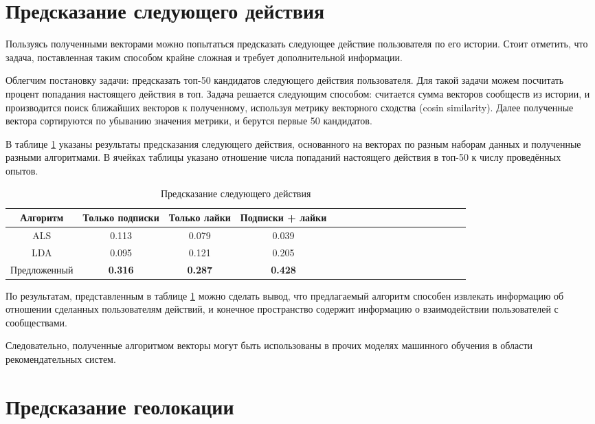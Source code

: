 \documentclass[times,specification,annotation]{itmo-student-thesis}
\begin{document}
\section{Предсказание следующего действия}\label{sec:next-action}
Пользуясь полученными векторами можно попытаться предсказать следующее действие пользователя по его истории. Стоит отметить, что задача, поставленная таким способом крайне сложная и требует дополнительной информации.

Облегчим постановку задачи: предсказать топ-50 кандидатов следующего действия пользователя. Для такой задачи можем посчитать процент попадания настоящего действия в топ. Задача решается следующим способом: считается сумма векторов сообществ из истории, и производится поиск ближайших векторов к полученному, используя метрику векторного сходства (cosin similarity). Далее полученные вектора сортируются по убыванию значения метрики, и берутся первые 50 кандидатов.

В таблице \ref {tab2-next-action} указаны результаты предсказания следующего действия, основанного на векторах по разным наборам данных и полученные разными алгоритмами. В ячейках таблицы указано отношение числа попаданий настоящего действия в топ-50 к числу проведённых опытов.  

\begin{table}[!h]
\caption{Предсказание следующего действия} \label{tab2-next-action}
\centering
\begin{tabular}{|*{18}{c|}}\hline
Алгоритм  & Только подписки  & Только лайки & Подписки + лайки \\\hline
ALS                        & 0.113 & 0.079  & 0.039 \\\hline
LDA                       & 0.095 & 0.121  & 0.205 \\\hline
Предложенный & \textbf{0.316} & \textbf{0.287} & \textbf{0.428} \\\hline
\end{tabular}
\end{table}

По результатам, представленным в таблице \ref{tab2-next-action} можно сделать вывод, что предлагаемый алгоритм способен извлекать информацию об отношении сделанных пользователям действий, и конечное пространство содержит информацию о взаимодействии пользователей с сообществами. 

Следовательно, полученные алгоритмом векторы могут быть использованы в прочих моделях машинного обучения в области рекомендательных систем.


\section{Предсказание геолокации} \label{sec:geo}
\end{document}
